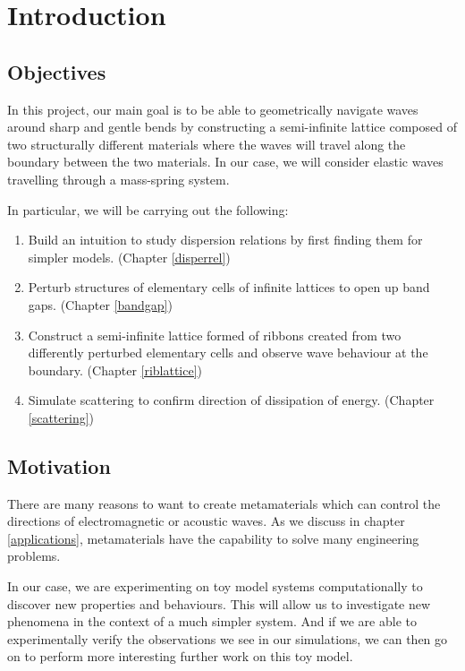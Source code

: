 \chapter{Introduction}

\section{Objectives}
In this project, our main goal is to be able to geometrically navigate waves
around sharp and gentle bends by constructing a semi-infinite lattice composed
of two structurally different materials where the waves will travel along the
boundary between the two materials. In our case, we will consider elastic waves
travelling through a mass-spring system.

In particular, we will be carrying out the following:

\begin{enumerate}
\item Build an intuition to study dispersion relations by first finding them
      for simpler models. (Chapter \ref{disperrel})
\item Perturb structures of elementary cells of infinite lattices to open up
      band gaps. (Chapter \ref{bandgap})
\item Construct a semi-infinite lattice formed of ribbons created from two
      differently perturbed elementary cells and observe wave behaviour at the
      boundary. (Chapter \ref{riblattice})
\item Simulate scattering to confirm direction of dissipation of energy.
      (Chapter \ref{scattering})
\end{enumerate}

\section{Motivation}
There are many reasons to want to create metamaterials which can control the
directions of electromagnetic or acoustic waves. As we discuss in chapter
\ref{applications}, metamaterials have the capability to solve many engineering
problems.

In our case, we are experimenting on toy model systems computationally to
discover new properties and behaviours. This will allow us to investigate new
phenomena in the context of a much simpler system. And if we are able to
experimentally verify the observations we see in our simulations, we can then
go on to perform more interesting further work on this toy model.
